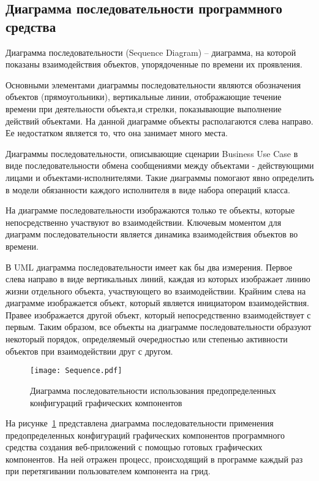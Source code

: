 \subsection{Диаграмма последовательности программного средства}
\label{sec:modeling:sequence}

Диаграмма последовательности (Sequence Diagram) – диаграмма, на которой показаны взаимодействия объектов, упорядоченные по времени их проявления.

Основными элементами диаграммы последовательности являются обозначения объектов (прямоугольники), вертикальные линии, отображающие течение времени при деятельности объекта,и стрелки, показывающие выполнение действий объектами. На данной диаграмме объекты располагаются слева направо. Ее недостатком является то, что она занимает много места.

Диаграммы последовательности, описывающие сценарии Business Use Case в виде последовательности обмена сообщениями между объектами - действующими лицами и объектами-исполнителями. Такие диаграммы помогают явно определить в модели обязанности каждого исполнителя в виде набора операций класса.

На диаграмме последовательности изображаются только те объекты, которые непосредственно участвуют во взаимодействии. Ключевым моментом для диаграмм последовательности является динамика взаимодействия объектов во времени.

В UML диаграмма последовательности имеет как бы два измерения. Первое слева направо в виде вертикальных линий, каждая из которых изображает линию жизни отдельного объекта, участвующего во взаимодействии. Крайним слева на диаграмме изображается объект, который является инициатором взаимодействия. Правее изображается другой объект, который непосредственно взаимодействует с первым. Таким образом, все объекты на диаграмме последовательности образуют некоторый порядок, определяемый очередностью или степенью активности объектов при взаимодействии друг с другом.

\begin{figure}[ht]
\centering
    \texttt{[image: Sequence.pdf]}
    \caption{Диаграмма последовательности использования предопределенных конфигураций графических компонентов}
    \label{sec:design:sequence_diagram}
\end{figure}

На рисунке~\ref{sec:design:sequence_diagram} представлена диаграмма последовательности применения предопределенных конфигураций графических компонентов программного средства создания веб-приложений с помощью готовых графических компонентов. 
На ней отражен процесс, происходящий в программе каждый раз при перетягивании пользователем компонента на грид.\pagebreak


